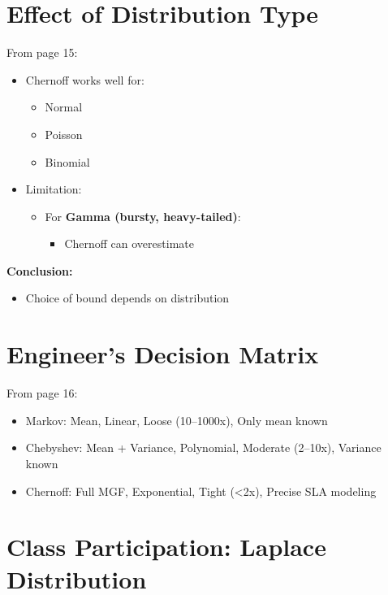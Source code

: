\documentclass[11pt]{article}
\begin{document}
\section{Effect of Distribution Type}

From page 15:

\begin{itemize}
\item Chernoff works well for:
\begin{itemize}
\item Normal
\item Poisson
\item Binomial
\end{itemize}

\item Limitation:
\begin{itemize}
\item For \textbf{Gamma (bursty, heavy-tailed)}:
\begin{itemize}
\item Chernoff can overestimate
\end{itemize}
\end{itemize}
\end{itemize}

\textbf{Conclusion:}

\begin{itemize}
\item Choice of bound depends on distribution
\end{itemize}

\section{Engineer’s Decision Matrix}

From page 16:

\begin{itemize}
\item Markov: Mean, Linear, Loose (10--1000x), Only mean known
\item Chebyshev: Mean + Variance, Polynomial, Moderate (2--10x), Variance known
\item Chernoff: Full MGF, Exponential, Tight (<2x), Precise SLA modeling
\end{itemize}

\section{Class Participation: Laplace Distribution}
\end{document}
